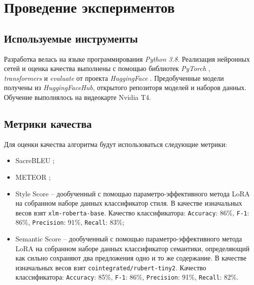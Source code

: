 \chapter{Проведение экспериментов} \label{cha:experiments}

\section{Используемые инструменты}
Разработка велась на языке программирования \textit{Python 3.8}.
Реализация нейронных сетей и оценка качества выполнены с помощью библиотек \textit{PyTorch} \cite{pytorch_lib}, \textit{transformers} и \textit{evaluate} от проекта \textit{HuggingFace} \cite{huggingface_transformers}.
Предобученные модели получены из \textit{HuggingFaceHub}, открытого репозиторя моделей и наборов данных.
Обучение выполнялось на видеокарте Nvidia T4.

\section{Метрики качества}

Для оценки качества алгоритма будут использоваться следующие метрики:
\begin{itemize}
    \item SacreBLEU \cite{sacrebleu};
    \item METEOR \cite{meteor};
    \item 
    Style Score -- дообученный с помощью параметро-эффективного метода LoRA \cite{lora} на собранном наборе данных классификатор стиля.
    В качестве изначальных весов взят \texttt{xlm-roberta-base}. Качество классификатора:
    \texttt{Accuracy}: 86\%,
    \texttt{F-1}: 86\%,
    \texttt{Precision}: 91\%,
    \texttt{Recall}: 83\%;
    \item 
    Semantic Score -- дообученный с помощью параметро-эффективного метода LoRA \cite{lora} на собранном наборе данных классификатор семантики, определяющий как сильно сохраняют два предложения одно и то же содержание.
    В качестве изначальных весов взят \texttt{cointegrated/rubert-tiny2}. Качество классификатора: 
    \texttt{Accuracy}: 85\%,
    \texttt{F-1}: 86\%,
    \texttt{Precision}: 91\%,
    \texttt{Recall}: 82\%.
\end{itemize}

